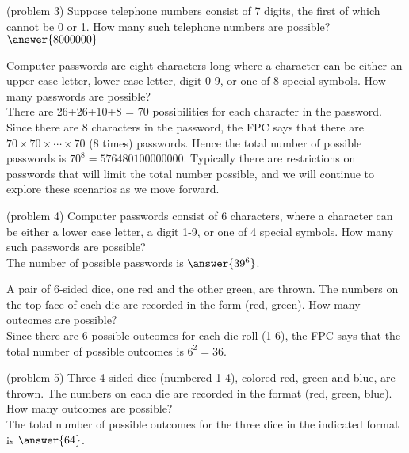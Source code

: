 \documentclass[handout]{ximera}
\begin{document}
\begin{problem}(problem 3)
Suppose telephone numbers consist of 7 digits, the first of which cannot be 0 or 1.  
How many such telephone numbers are possible?\\
$\answer{8000000}$

\end{problem}


\begin{example}[example 4]
Computer passwords are eight characters long where a character can be either an upper case letter, 
lower case letter, digit 0-9, or one of 8 special symbols. How many passwords are possible?\\
There are 26+26+10+8 = 70 possibilities for each character in the password. Since there are 8 characters in the password,
the FPC says that there are $70\times 70\times \cdots \times 70$ (8 times) passwords.
Hence the total number of possible passwords is $70^8 = 576480100000000$. 
Typically there are restrictions on passwords that will limit the total number possible, and we will 
continue to explore these scenarios as we move forward.
\end{example}

\begin{problem}(problem 4)
Computer passwords consist of 6 characters, where a character can be either a lower case letter, 
a digit 1-9, or one of 4 special symbols.  How many such passwords are possible?\\
The number of possible passwords is $\answer{39^6}$.
\end{problem} 

\begin{example}[example 5]
A pair of 6-sided dice, one red and the other green, are thrown. The numbers on the top face of each die are recorded
in the form (red, green). How many outcomes are possible?\\
Since there are 6 possible outcomes for each die roll (1-6), the FPC says that the total number of possible outcomes is $6^2 = 36$.
\end{example}

\begin{problem}(problem 5)
Three 4-sided dice (numbered 1-4), colored red, green and blue, are thrown. 
The numbers on each die are recorded in the format 
(red, green, blue).  How many outcomes are possible?\\
The total number of possible outcomes for the three dice in the indicated format is $\answer{64}$.
\end{problem} 
\end{document}
